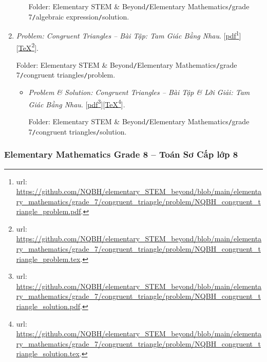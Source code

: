 \documentclass[12pt,twoside]{book}
\begin{document}
\begin{enumerate}
\begin{itemize}
		Folder: {\sf Elementary STEM \& Beyond{\tt/}Elementary Mathematics{\tt/}grade 7{\tt/}algebraic expression{\tt/}solution}.
	\end{itemize}
	\item {\it Problem: Congruent Triangles -- Bài Tập: Tam Giác Bằng Nhau}. [\href{https://github.com/NQBH/elementary_STEM_beyond/blob/main/elementary_mathematics/grade_7/congruent_triangle/problem/NQBH_congruent_triangle_problem.pdf}{pdf}\footnote{{\sc url}: \url{https://github.com/NQBH/elementary_STEM_beyond/blob/main/elementary_mathematics/grade_7/congruent_triangle/problem/NQBH_congruent_triangle_problem.pdf}.}][\href{https://github.com/NQBH/elementary_STEM_beyond/blob/main/elementary_mathematics/grade_7/congruent_triangle/problem/NQBH_congruent_triangle_problem.tex}{\TeX}\footnote{{\sc url}: \url{https://github.com/NQBH/elementary_STEM_beyond/blob/main/elementary_mathematics/grade_7/congruent_triangle/problem/NQBH_congruent_triangle_problem.tex}.}].
	
	Folder: {\sf Elementary STEM \& Beyond{\tt/}Elementary Mathematics{\tt/}grade 7{\tt/}congruent triangles{\tt/}problem}.
	\begin{itemize}
		\item {\it Problem \& Solution: Congruent Triangles -- Bài Tập \& Lời Giải: Tam Giác Bằng Nhau}. [\href{https://github.com/NQBH/elementary_STEM_beyond/blob/main/elementary_mathematics/grade_7/congruent_triangle/problem/NQBH_congruent_triangle_solution.pdf}{pdf}\footnote{{\sc url}: \url{https://github.com/NQBH/elementary_STEM_beyond/blob/main/elementary_mathematics/grade_7/congruent_triangle/problem/NQBH_congruent_triangle_solution.pdf}.}][\href{https://github.com/NQBH/elementary_STEM_beyond/blob/main/elementary_mathematics/grade_7/congruent_triangle/problem/NQBH_congruent_triangle_solution.tex}{\TeX}\footnote{{\sc url}: \url{https://github.com/NQBH/elementary_STEM_beyond/blob/main/elementary_mathematics/grade_7/congruent_triangle/problem/NQBH_congruent_triangle_solution.tex}.}].
		
		Folder: {\sf Elementary STEM \& Beyond{\tt/}Elementary Mathematics{\tt/}grade 7{\tt/}congruent triangles{\tt/}solution}.
	\end{itemize}
\end{enumerate}

\subsubsection{Elementary Mathematics Grade 8 -- Toán Sơ Cấp lớp 8}
\end{document}
